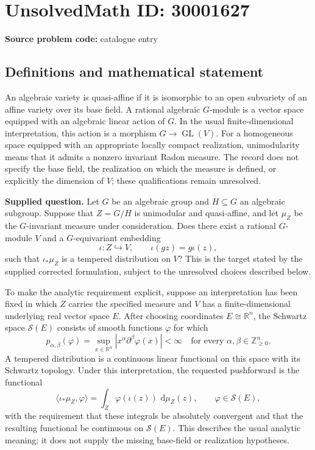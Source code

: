 \documentclass[11pt]{article}
\newcommand{\Z}{\mathbb{Z}}
\newcommand{\R}{\mathbb{R}}
\newcommand{\dd}{\,\mathrm{d}}
\begin{document}
\section*{UnsolvedMath ID: 30001627}
\textbf{Source problem code:} catalogue entry
\subsection{Definitions and mathematical statement}
An algebraic variety is quasi-affine if it is isomorphic to an open subvariety of an affine variety over its base field. A rational algebraic \(G\)-module is a vector space equipped with an algebraic linear action of \(G\). In the usual finite-dimensional interpretation, this action is a morphism \(G\to\operatorname{GL}(V)\). For a homogeneous space equipped with an appropriate locally compact realization, unimodularity means that it admits a nonzero invariant Radon measure. The record does not specify the base field, the realization on which the measure is defined, or explicitly the dimension of \(V\); these qualifications remain unresolved.

\textbf{Supplied question.} Let \(G\) be an algebraic group and \(H\subseteq G\) an algebraic subgroup. Suppose that \(Z=G/H\) is unimodular and quasi-affine, and let \(\mu_Z\) be the \(G\)-invariant measure under consideration. Does there exist a rational \(G\)-module \(V\) and a \(G\)-equivariant embedding
\[
\iota:Z\hookrightarrow V,\qquad \iota(gz)=g\iota(z),
\]
such that \(\iota_*\mu_Z\) is a tempered distribution on \(V\)? This is the target stated by the supplied corrected formulation, subject to the unresolved choices described below.

To make the analytic requirement explicit, suppose an interpretation has been fixed in which \(Z\) carries the specified measure and \(V\) has a finite-dimensional underlying real vector space \(E\). After choosing coordinates \(E\cong\R^n\), the Schwartz space \(\mathcal S(E)\) consists of smooth functions \(\varphi\) for which
\[
p_{\alpha,\beta}(\varphi)=\sup_{x\in\R^n}\left|x^\alpha\partial^\beta\varphi(x)\right|<\infty
\quad\text{for every }\alpha,\beta\in\Z_{\geq0}^{n}.
\]
A tempered distribution is a continuous linear functional on this space with its Schwartz topology. Under this interpretation, the requested pushforward is the functional
\[
\langle\iota_*\mu_Z,\varphi\rangle
=\int_Z\varphi(\iota(z))\,\dd\mu_Z(z),
\qquad \varphi\in\mathcal S(E),
\]
with the requirement that these integrals be absolutely convergent and that the resulting functional be continuous on \(\mathcal S(E)\). This describes the usual analytic meaning; it does not supply the missing base-field or realization hypotheses.
\end{document}
